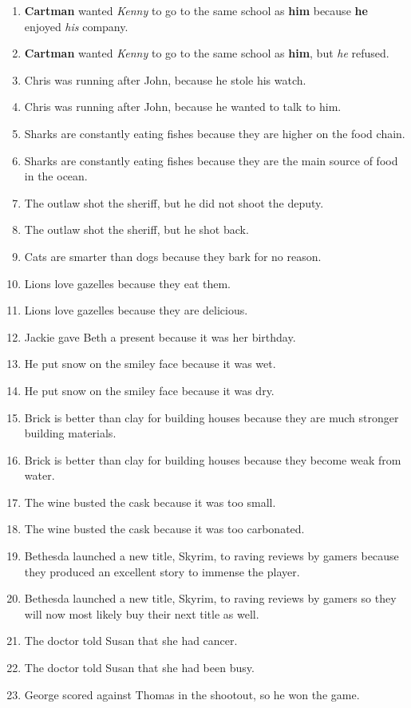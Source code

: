 \documentclass{article}
\begin{document}
\begin{enumerate}
	\item {\bf Cartman} wanted {\it Kenny} to go to the same school as {\bf him} because {\bf he} enjoyed {\it his} company.
	\item {\bf Cartman} wanted {\it Kenny} to go to the same school as {\bf him}, but {\it he} refused.
	\item Chris was running after John, because he stole his watch.
	\item Chris was running after John, because he wanted to talk to him.
	\item Sharks are constantly eating fishes because they are higher on the food chain.
	\item Sharks are constantly eating fishes because they are the main source of food in the ocean.
	\item The outlaw shot the sheriff, but he did not shoot the deputy.
	\item The outlaw shot the sheriff, but he shot back.
	\item Cats are smarter than dogs because they bark for no reason.
	\item Lions love gazelles because they eat them.
	\item Lions love gazelles because they are delicious.
	\item Jackie gave Beth a present because it was her birthday.
	\item He put snow on the smiley face because it was wet.
	\item He put snow on the smiley face because it was dry.
	\item Brick is better than clay for building houses because they are much stronger building materials.
	\item Brick is better than clay for building houses because they become weak from water.
	\item The wine busted the cask because it was too small.
	\item The wine busted the cask because it was too carbonated.
	\item Bethesda launched a new title, Skyrim, to raving reviews by gamers because they produced an excellent story to immense the player.
	\item Bethesda launched a new title, Skyrim, to raving reviews by gamers so they will now most likely buy their next title as well.
	\item The doctor told Susan that she had cancer.
	\item The doctor told Susan that she had been busy.
	\item George scored against Thomas in the shootout, so he won the game.

\end{enumerate}
\end{document}

